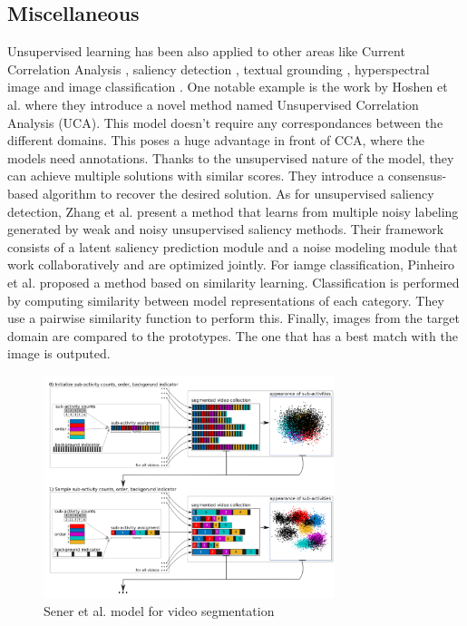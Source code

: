 \documentclass[letterpaper, 10 pt, conference]{ieeeconf}  %
\begin{document}
\subsection{Miscellaneous}

Unsupervised learning has been also applied to other areas like Current Correlation Analysis \cite{Hoshen_2018_CVPR}, saliency detection \cite{Zhang_deep_2018_CVPR}, textual grounding \cite{Yeh_2018_CVPR}, hyperspectral image \cite{Qu_2018_CVPR} and image classification  \cite{Pinheiro_2018_CVPR}. One notable example is the work by Hoshen et al. \cite{Hoshen_2018_CVPR} where they introduce a novel method named Unsupervised Correlation Analysis (UCA). This model doesn't require any correspondances between the different domains. This poses a huge advantage in front of CCA, where the models need annotations. Thanks to the unsupervised nature of the model, they can achieve multiple solutions with similar scores. They introduce a consensus-based algorithm to recover the desired solution. As for unsupervised saliency detection, Zhang et al. \cite{Zhang_deep_2018_CVPR} present a method that learns from multiple noisy labeling generated by weak and noisy unsupervised saliency methods. Their framework consists of a latent saliency prediction module and a noise modeling module that work collaboratively and are optimized jointly. For iamge classification, Pinheiro et al. \cite{Pinheiro_2018_CVPR} proposed a method based on similarity learning. Classification is performed by computing similarity between model representations of each category. They use a pairwise similarity function to perform this. Finally, images from the target domain are compared to the prototypes. The one that has a best match with the image is outputed.


\begin{figure}[h!]
\centering
\includegraphics[width=8.5cm]{Subactivity.png}
\caption{Sener et al. model for video segmentation}
\label{fig:Subactivity}
\end{figure}
\end{document}
